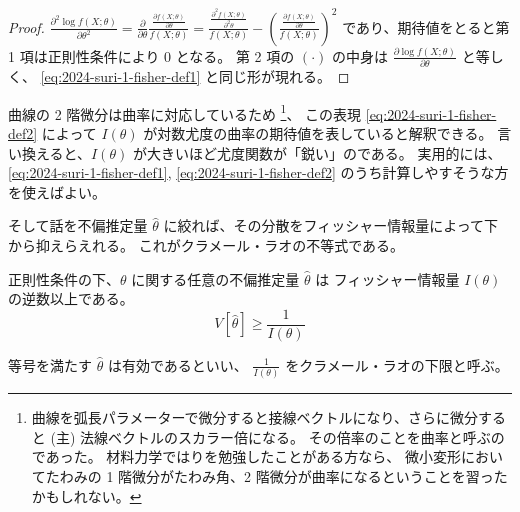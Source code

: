 \documentclass[./main.tex]{subfiles}
\begin{document}
\begin{enumerate}
        \begin{proof}
            \small
            $\frac{\partial^2 \log f(X; \theta)}{\partial \theta^2}
                = \frac{\partial}{\partial \theta} \frac{\frac{\partial f(X; \theta)}{\partial \theta} }{f(X; \theta)}
                = \frac{\frac{\partial^2 f(X; \theta)}{\partial^2 \theta} }{f(X; \theta)} 
                    - \left( \frac{\frac{\partial f(X; \theta)}{\partial \theta} }{f(X; \theta)} \right)^2$
            であり、期待値をとると第 1 項は正則性条件により $0$ となる。
            第 2 項の $(\cdot)$ の中身は $\frac{\partial \log f(X; \theta)}{\partial \theta}$ と等しく、
            \eqref{eq:2024-suri-1-fisher-def1} と同じ形が現れる。
        \end{proof}

        曲線の 2 階微分は曲率に対応しているため
        \footnote{曲線を弧長パラメーターで微分すると接線ベクトルになり、さらに微分すると (主) 法線ベクトルのスカラー倍になる。
        その倍率のことを曲率と呼ぶのであった。
        材料力学ではりを勉強したことがある方なら、
        微小変形においてたわみの 1 階微分がたわみ角、2 階微分が曲率になるということを習ったかもしれない。}、
        この表現 \eqref{eq:2024-suri-1-fisher-def2} によって $I (\theta)$ が対数尤度の曲率の期待値を表していると解釈できる。
        言い換えると、$I(\theta)$ が大きいほど尤度関数が「鋭い」のである。
        実用的には、\eqref{eq:2024-suri-1-fisher-def1}, \eqref{eq:2024-suri-1-fisher-def2} のうち計算しやすそうな方を使えばよい。


        そして話を不偏推定量 $\hat{\theta}$ に絞れば、その分散をフィッシャー情報量によって下から抑えらえれる。
        これがクラメール・ラオの不等式である。

        \begin{theorem}
            正則性条件の下、$\theta$ に関する任意の不偏推定量 $\hat{\theta}$ は フィッシャー情報量 $I (\theta)$ の逆数以上である。
            \begin{equation}\label{eq:2024-suri-1-cramer-rao}
                V [ \hat{\theta}] 
                    \geq \frac{1}{I (\theta)}
            \end{equation}
        \end{theorem}
        等号を満たす $\hat{\theta}$ は有効であるといい、 
        $\frac{1}{I (\theta)}$ をクラメール・ラオの下限と呼ぶ。


\end{enumerate}
\end{document}

